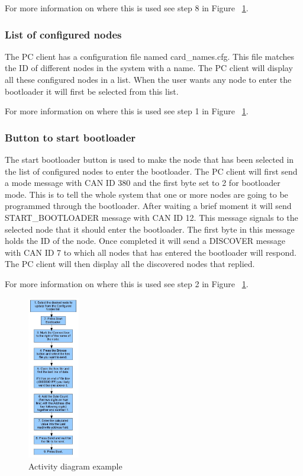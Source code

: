 For more information on where this is used see step 8 in Figure ~\ref{fig:activity_figure}.

\subsubsection{List of configured nodes}
The PC client has a configuration file named card\_names.cfg. This file matches the ID of different nodes in the system with a name. The PC client will display all these configured nodes in a list. When the user wants any node to enter the bootloader it will first be selected from this list.

For more information on where this is used see step 1 in Figure ~\ref{fig:activity_figure}.

\subsubsection{Button to start bootloader}
The start bootloader button is used to make the node that has been selected in the list of configured nodes to enter the bootloader. The PC client will first send a mode message with CAN ID 380 and the first byte set to 2 for bootloader mode. This is to tell the whole system that one or more nodes are going to be programmed through the bootloader. After waiting a brief moment it will send START\_BOOTLOADER message with CAN ID 12. This message signals to the selected node that it should enter the bootloader. The first byte in this message holds the ID of the node. Once completed it will send a DISCOVER message with CAN ID 7 to which all nodes that has entered the bootloader will respond. The PC client will then display all the discovered nodes that replied.

For more information on where this is used see step 2 in Figure ~\ref{fig:activity_figure}.

\begin{figure}[h]
\begin{center}
    \includegraphics[width=0.20\textwidth]{./figure/activity.jpg}
\end{center}
    \caption{Activity diagram example}
    \label{fig:activity_figure}
\end{figure}